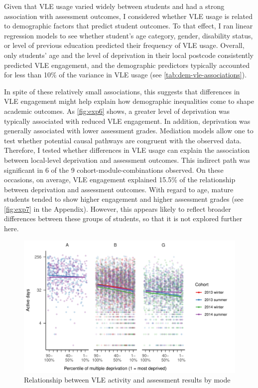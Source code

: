 \documentclass[
  english,
  man,mask,floatsintext]{apa6}
\begin{document}
Given that VLE usage varied widely between students and had a strong association with assessment outcomes, I considered whether VLE usage is related to demographic factors that predict student outcomes. To that effect, I ran linear regression models to see whether student's age category, gender, disability status, or level of previous education predicted their frequency of VLE usage. Overall, only students' age and the level of deprivation in their local postcode consistently predicted VLE engagement, and the demographic predictors typically accounted for less than 10\% of the variance in VLE usage (see \autoref{tab:dem-vle-associations}).

In spite of these relatively small associations, this suggests that differences in VLE engagement might help explain how demographic inequalities come to shape academic outcomes. As \autoref{fig:exp6} shows, a greater level of deprivation was typically associated with reduced VLE engagement. In addition, deprivation was generally associated with lower assessment grades. Mediation models allow one to test whether potential causal pathways are congruent with the observed data. Therefore, I tested whether differences in VLE usage can explain the association between local-level deprivation and assessment outcomes. This indirect path was significant in 6 of the 9 cohort-module-combinations observed. On these occasions, on average, VLE engagement explained 15.5\% of the relationship between deprivation and assessment outcomes. With regard to age, mature students tended to show higher engagement and higher assessment grades (see \autoref{fig:exp7} in the Appendix). However, this appears likely to reflect broader differences between these groups of students, so that it is not explored further here.

\begin{figure}
\centering
\includegraphics{Assigment-2---OU-data_files/figure-latex/unnamed-chunk-8-1.pdf}
\caption{\label{fig:unnamed-chunk-8}Relationship between VLE activity and assessment results by mode \label{fig:exp6}}
\end{figure}
\end{document}
